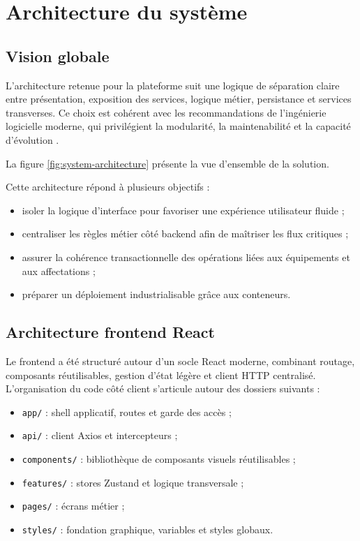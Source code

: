 ﻿\chapter{Architecture du système}
\label{chap:architecture}

\section{Vision globale}
L'architecture retenue pour la plateforme suit une logique de séparation claire entre présentation, exposition des services, logique métier, persistance et services transverses. Ce choix est cohérent avec les recommandations de l'ingénierie logicielle moderne, qui privilégient la modularité, la maintenabilité et la capacité d'évolution \cite{pressman2014,sommerville2015}.

La figure \ref{fig:system-architecture} présente la vue d'ensemble de la solution.


Cette architecture répond à plusieurs objectifs :
\begin{itemize}
  \item isoler la logique d'interface pour favoriser une expérience utilisateur fluide ;
  \item centraliser les règles métier côté backend afin de maîtriser les flux critiques ;
  \item assurer la cohérence transactionnelle des opérations liées aux équipements et aux affectations ;
  \item préparer un déploiement industrialisable grâce aux conteneurs.
\end{itemize}

\section{Architecture frontend React}
Le frontend a été structuré autour d'un socle React moderne, combinant routage, composants réutilisables, gestion d'état légère et client HTTP centralisé. L'organisation du code côté client s'articule autour des dossiers suivants :

\begin{keybox}
\begin{itemize}
  \item \texttt{app/} : shell applicatif, routes et garde des accès ;
  \item \texttt{api/} : client Axios et intercepteurs ;
  \item \texttt{components/} : bibliothèque de composants visuels réutilisables ;
  \item \texttt{features/} : stores Zustand et logique transversale ;
  \item \texttt{pages/} : écrans métier ;
  \item \texttt{styles/} : fondation graphique, variables et styles globaux.
\end{itemize}
\end{keybox}

